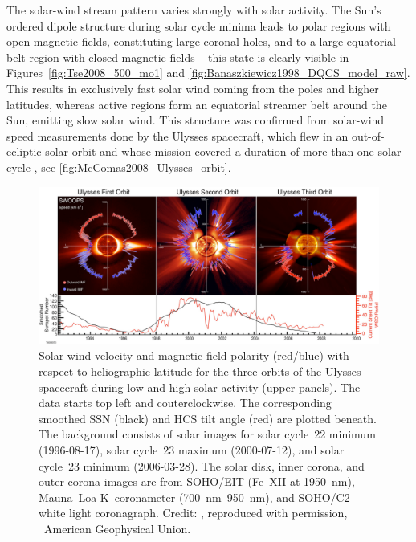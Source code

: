 The solar-wind stream pattern varies strongly with solar activity. The Sun's ordered dipole structure during solar cycle minima leads to polar regions with open magnetic fields, constituting large coronal holes, and to a large equatorial belt region with closed magnetic fields -- this state is clearly visible in Figures~\ref{fig:Tse2008_500_mo1} and \ref{fig:Banaszkiewicz1998_DQCS_model_raw}. This results in exclusively fast solar wind coming from the poles and higher latitudes, whereas active regions form an equatorial streamer belt around the Sun, emitting slow solar wind. This structure was confirmed from solar-wind speed measurements done by the Ulysses spacecraft, which flew in an out-of-ecliptic solar orbit and whose mission covered a duration of more than one solar cycle \citep{McComas200809}, see \autoref{fig:McComas2008_Ulysses_orbit}.
\begin{figure}[htb]
	\centering
	\includegraphics[width=\textwidth]{images/McComas2008_Ulysses_orbit_.png}
	\caption{Solar-wind velocity and magnetic field polarity (red/blue) with respect to heliographic latitude for the three orbits of the Ulysses spacecraft during low and high solar activity (upper panels). The data starts top left and couterclockwise. The corresponding smoothed SSN (black) and HCS tilt angle (red) are plotted beneath. The background consists of solar images for solar cycle~22 minimum (1996-08-17), solar cycle~23 maximum (2000-07-12), and solar cycle~23 minimum (2006-03-28). The solar disk, inner corona, and outer corona images are from SOHO/EIT (Fe~XII at \SI{1950}{\nano\meter}), Mauna~Loa K~coronameter (\SIrange{700}{950}{\nano\meter}), and SOHO/C2 white light coronagraph. Credit: \citet[][Fig.~1]{McComas200809}, reproduced with permission, \textcopyright~American Geophysical Union.}
	\label{fig:McComas2008_Ulysses_orbit}
\end{figure}
